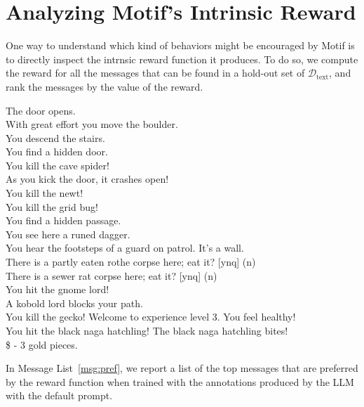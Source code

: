 \documentclass{article} %
\begin{document}
\section{Analyzing Motif's Intrinsic Reward} \label{appendix:motif_intrinsic}
One way to understand which kind of behaviors might be encouraged by Motif is to directly inspect the intrnsic reward function it produces.
To do so, we compute the reward for all the messages that can be found in a hold-out set of $\mathcal D_\text{text}$, and rank the messages by the value of the reward.

\begin{messages}[h]
\begin{mymessagebox}[frametitle=Highly preferred messages]
\small{}\selectfont
 The door opens.\\
 With great effort you move the boulder.\\
 You descend the stairs. \\
 You find a hidden door.\\
 You kill the cave spider! \\
 As you kick the door, it crashes open! \\
 You kill the newt! \\
 You kill the grid bug! \\
 You find a hidden passage.\\
You see here a runed dagger.\\
You hear the footsteps of a guard on patrol.  It's a wall.\\
 There is a partly eaten rothe corpse here; eat it? [ynq] (n)\\
 There is a sewer rat corpse here; eat it? [ynq] (n)\\
 You hit the gnome lord!\\
A kobold lord blocks your path.\\
You kill the gecko!  Welcome to experience level 3.  You feel healthy!\\
 You hit the black naga hatchling!  The black naga hatchling bites!\\
\$ - 3 gold pieces.\\
\end{mymessagebox}

\caption{Most preferred messages according to the reward function induced by feeding the default prompt to the LLM for annotating the dataset.}
\label{msg:pref}
\end{messages}
In Message List~\ref{msg:pref}, we report a list of the top messages that are preferred by the reward function when trained with the annotations produced by the LLM with the default prompt.
\end{document}
